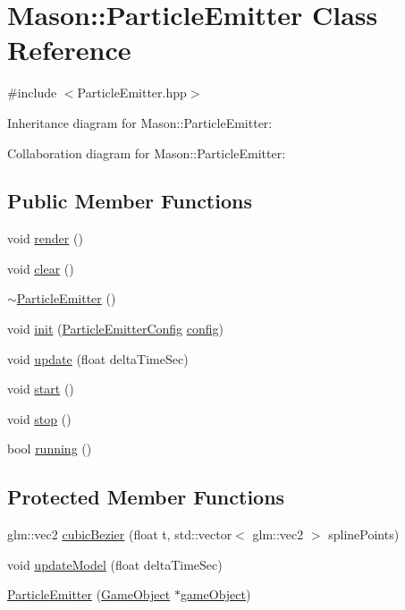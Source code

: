 \hypertarget{class_mason_1_1_particle_emitter}{}\section{Mason\+:\+:Particle\+Emitter Class Reference}
\label{class_mason_1_1_particle_emitter}


{\ttfamily \#include $<$Particle\+Emitter.\+hpp$>$}



Inheritance diagram for Mason\+:\+:Particle\+Emitter\+:


Collaboration diagram for Mason\+:\+:Particle\+Emitter\+:
\subsection*{Public Member Functions}
\begin{DoxyCompactItemize}
\item 
void \hyperlink{class_mason_1_1_particle_emitter_aa3b6ee77d7b15e2064003d8f75d53774}{render} ()
\item 
void \hyperlink{class_mason_1_1_particle_emitter_a14b63dca4ee3812ffb68f8927956683d}{clear} ()
\item 
\hyperlink{class_mason_1_1_particle_emitter_a6f4952f7555ede99d74d42b30c80f3e2}{$\sim$\+Particle\+Emitter} ()
\item 
void \hyperlink{class_mason_1_1_particle_emitter_a31dbabbe960449bcc71ac94f0421a07f}{init} (\hyperlink{struct_mason_1_1_particle_emitter_config}{Particle\+Emitter\+Config} \hyperlink{class_mason_1_1_particle_emitter_a86af1c5bfa7b301f334473b458d16ba0}{config})
\item 
void \hyperlink{class_mason_1_1_particle_emitter_a34da56b84fe4810c701f4b1541e079dc}{update} (float delta\+Time\+Sec)
\item 
void \hyperlink{class_mason_1_1_particle_emitter_aba4bcba68194e57b715779426ce68a19}{start} ()
\item 
void \hyperlink{class_mason_1_1_particle_emitter_a4843aa3afd1c4d49c9c2519837fffe81}{stop} ()
\item 
bool \hyperlink{class_mason_1_1_particle_emitter_acaf3e09e8eb747d3c603c225a781b5ff}{running} ()
\end{DoxyCompactItemize}
\subsection*{Protected Member Functions}
\begin{DoxyCompactItemize}
\item 
glm\+::vec2 \hyperlink{class_mason_1_1_particle_emitter_a9750a2b4f2f644691822b266359f1c86}{cubic\+Bezier} (float t, std\+::vector$<$ glm\+::vec2 $>$ spline\+Points)
\item 
void \hyperlink{class_mason_1_1_particle_emitter_abc43ce83f1adef05e78b166422217cad}{update\+Model} (float delta\+Time\+Sec)
\item 
\hyperlink{class_mason_1_1_particle_emitter_a30525758eaab5f41e625b8354e80d219}{Particle\+Emitter} (\hyperlink{class_mason_1_1_game_object}{Game\+Object} $\ast$\hyperlink{class_mason_1_1_component_a30030370c35f5562cbbbb0927b0448c8}{game\+Object})
\end{DoxyCompactItemize}
